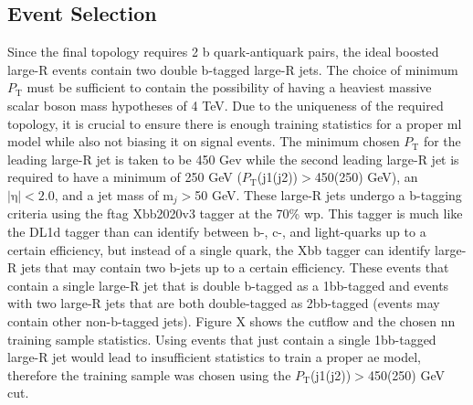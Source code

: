 \subsection{Event Selection}

Since the final topology requires 2 b quark-antiquark pairs, the ideal boosted large-R events contain two double b-tagged large-R jets. The choice of minimum $\textit{P}_{\textrm{T}}$ 
must be sufficient to contain the possibility of having a heaviest massive scalar boson mass hypotheses of 4 TeV. Due to the uniqueness of the required topology, it is crucial 
to ensure there is enough training statistics for a proper \gls{ml} model while also not biasing it on signal events. The minimum chosen $\textit{P}_{\textrm{T}}$ for the leading 
large-R jet is taken to be 450 Gev while the second leading large-R jet is required to have a minimum of 250 GeV ($\textit{P}_{\textrm{T}}$(j1(j2))$>$450(250) GeV), an 
$|\textrm{η}| < \textrm{2.0}$, and a jet mass of $\textrm{m}_j>$50 GeV. These large-R jets undergo a b-tagging criteria using the \gls{ftag} Xbb2020v3 tagger at the 70\% \gls{wp}.
This tagger is much like the DL1d tagger than can identify between b-, c-, and light-quarks up to a certain efficiency, but instead of a single quark, the Xbb tagger can 
identify large-R jets that may contain two b-jets up to a certain efficiency. These events that contain a single large-R jet that is double b-tagged as a 1bb-tagged and 
events with two large-R jets that are both double-tagged as 2bb-tagged (events may contain other non-b-tagged jets). Figure X shows the cutflow and the chosen \gls{nn} training sample statistics. 
Using events that just contain a single 1bb-tagged large-R jet would lead to insufficient statistics to train a proper \gls{ae} model, therefore the training sample was chosen 
using the $\textit{P}_{\textrm{T}}$(j1(j2))$>$450(250) GeV cut. 

